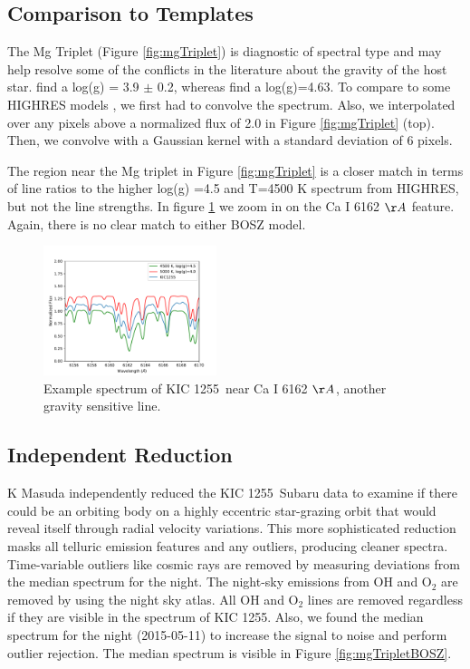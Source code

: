 \documentclass[twocolumn]{aastex61}
\newcommand{\shStar}{KIC 1255}
\begin{document}
\subsection{Comparison to Templates}

The Mg Triplet (Figure \ref{fig:mgTriplet}) is diagnostic of spectral type and may help resolve some of the conflicts in the literature about the gravity of the host star.
\citet{kawahara2013starspots} find a log(g) = 3.9 $\pm$ 0.2, whereas \citet{rappaport} find a log(g)=4.63.
To compare to some HIGHRES models \citep{coelho2014hires}, we first had to convolve the spectrum.
Also, we interpolated over any pixels above a normalized flux of 2.0 in Figure \ref{fig:mgTriplet} (top).
Then, we convolve with a Gaussian kernel with a standard deviation of 6 pixels.

The region near the Mg triplet in Figure \ref{fig:mgTriplet} is a closer match in terms of line ratios to the higher log(g) =4.5 and T=4500 K spectrum from HIGHRES, but not the line strengths.
In figure \ref{fig:CaILine} we zoom in on the Ca I 6162 $\AA$ feature.
Again, there is no clear match to either BOSZ model.

\begin{figure}[!hbtp]
\begin{centering}
\includegraphics[width=0.45\textwidth]{images/subaru/CaI6162_spec.pdf}
\caption{Example spectrum of \shStar\ near Ca I 6162 $\AA$, another gravity sensitive line.}\label{fig:CaILine}
\end{centering}
\end{figure}

\subsection{Independent Reduction}
K Masuda independently reduced the \shStar\ Subaru data to examine if there could be an orbiting body on a highly eccentric star-grazing orbit that would reveal itself through radial velocity variations.
This more sophisticated reduction masks all telluric emission features and any outliers, producing cleaner spectra.
Time-variable outliers like cosmic rays are removed by measuring deviations from the median spectrum for the night.
The night-sky emissions from OH and O$_2$ are removed by using the \citet{osterbrock1996lineAtlas} night sky atlas.
All OH and O$_2$ lines are removed regardless if they are visible in the spectrum of \shStar.
Also, we found the median spectrum for the night (2015-05-11) to increase the signal to noise and perform outlier rejection.
The median spectrum is visible in Figure \ref{fig:mgTripletBOSZ}.
\end{document}
